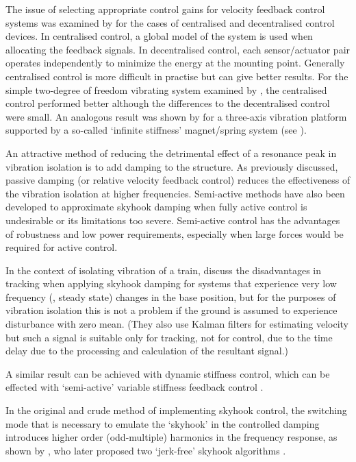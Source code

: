 The issue of selecting appropriate control gains for velocity feedback control systems was examined by \textcite{engels2008} for the cases of centralised and decentralised control devices.
In centralised control, a global model of the system is used when allocating the feedback signals.
In decentralised control, each sensor/actuator pair operates independently to minimize the energy at the mounting point.
Generally centralised control is more difficult in practise but can give better results.
For the simple two-degree of freedom vibrating system examined by \textcite{engels2008}, the centralised control performed better although the differences to the decentralised control were small.
An analogous result was shown by \textcite{hoque2006} for a three-axis vibration platform supported by a so-called `infinite stiffness' magnet/spring system (see ).

An attractive method of reducing the detrimental effect of a resonance peak in vibration isolation is to add damping to the structure. As previously discussed, passive damping (or relative velocity feedback control) reduces the effectiveness of the vibration isolation at higher frequencies.
Semi-active methods have also been developed to approximate skyhook damping when fully active control is undesirable \cite{liu2002,liu2005,ahmadian2004} or its limitations too severe.
Semi-active control has the advantages of robustness and low power requirements, especially when large forces would be required for active control.

In the context of isolating vibration of a train, \textcite{li1999} discuss the disadvantages in tracking when applying skyhook damping for systems that experience very low frequency (\ie, steady state) changes in the base position, but for the purposes of vibration isolation this is not a problem if the ground is assumed to experience disturbance with zero mean.
(They also use Kalman filters for estimating velocity but such a signal is suitable only for tracking, not for control, due to the time delay due to the processing and calculation of the resultant signal.)

A similar result  can be achieved with dynamic stiffness control, which can be effected with `semi-active' variable stiffness feedback control \cite{leavitt2007}.

In the original and crude method of implementing skyhook control, the switching mode that is necessary to emulate the `skyhook' in the controlled damping introduces higher order (odd-multiple) harmonics in the frequency response, as shown by \textcite{ahmadian2001}, who later proposed two `jerk-free' skyhook algorithms \cite{ahmadian2004}.

